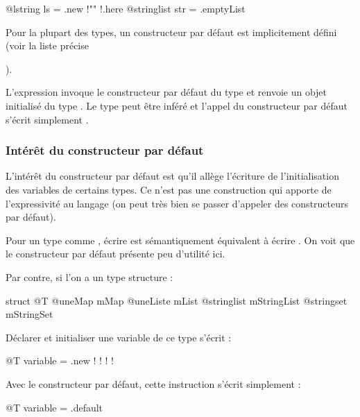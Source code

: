 \begin{galgascode}
@lstring ls = .new {!"" !.here}
@stringlist str = .emptyList
\end{galgascode}









Pour la plupart des types, un constructeur par défaut est implicitement défini (voir la liste précise {).


L'expression  invoque le constructeur par défaut du type  et renvoie un objet initialisé du type . Le type  peut être inféré et l'appel du constructeur par défaut s'écrit simplement .

\subsubsection{Intérêt du constructeur par défaut}


L'intérêt du constructeur par défaut est qu'il allège l'écriture de l'initialisation des variables de certains types. Ce n'est pas une construction qui apporte de l'expressivité au langage (on peut très bien se passer d'appeler des constructeurs par défaut).

Pour un type comme , écrire  est sémantiquement équivalent à écrire . On voit que le constructeur par défaut présente peu d'utilité ici.

Par contre, si l'on a un type structure :

\begin{galgascode}
struct @T {
  @uneMap mMap
  @uneListe mList
  @stringlist mStringList
  @stringset mStringSet
}
\end{galgascode}

Déclarer et initialiser une variable de ce type s'écrit :

\begin{galgascode}
@T variable = .new {
  !{}
  !{}
  !{}
  !{}
}
\end{galgascode}

Avec le constructeur par défaut, cette instruction s'écrit simplement :

\begin{galgascode}
@T variable = .default
\end{galgascode}

}

